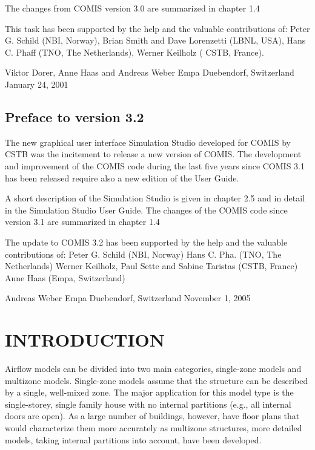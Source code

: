 \documentclass[10pt]{book}
\begin{document}
The changes from COMIS version 3.0 are summarized in chapter 1.4 

This task has been supported by the help and the valuable contributions of: 
Peter G. Schild (NBI, Norway), Brian Smith and Dave Lorenzetti (LBNL, USA), Hans C. Phaff (TNO, The Netherlands), Werner Keilholz ( CSTB, France). 

Viktor Dorer, Anne Haas and Andreas Weber 
Empa Duebendorf, Switzerland 
January 24, 2001 

\section*{Preface to version 3.2}
The new graphical user interface Simulation Studio developed for COMIS by CSTB was the incitement to release a new version of COMIS. The development and improvement of the COMIS code during the last five years since COMIS 3.1 has been released require also a new edition of the User Guide. 

A short description of the Simulation Studio is given in chapter 2.5 and in detail in the Simulation Studio User Guide. The changes of the COMIS code since version 3.1 are summarized in chapter 1.4 

The update to COMIS 3.2 has been supported by the help and the valuable contributions of: 
Peter G. Schild (NBI, Norway) 
Hans C. Pha. (TNO, The Netherlands) 
Werner Keilholz, Paul Sette and Sabine Taristas (CSTB, France) 
Anne Haas (Empa, Switzerland) 

Andreas Weber 
Empa Duebendorf, Switzerland 
November 1, 2005

\tableofcontents
\mainmatter
\chapter{INTRODUCTION}
Airflow models can be divided into two main categories, single-zone models and multizone models. Single-zone models assume that the structure can be described by a single, well-mixed zone. The major application for this model type is the single-storey, single family house with no internal partitions (e.g., all internal doors are open). As a large number of buildings, however, have floor plans that would characterize them more accurately as multizone structures, more detailed models, taking internal partitions into account, have been developed.
\end{document}
